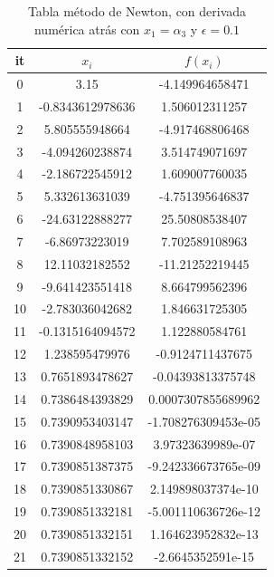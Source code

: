 \documentclass{article} %
\begin{document}
\begin{table}[H]
\centering
\begin{tabular}{|c|c|c|}
\hline
it & $x_i$ & $f(x_i)$\\
\hline
0 & 3.15 & -4.149964658471\\
1 & -0.8343612978636 & 1.506012311257\\
2 & 5.805555948664 & -4.917468806468\\
3 & -4.094260238874 & 3.514749071697\\
4 & -2.186722545912 & 1.609007760035\\
5 & 5.332613631039 & -4.751395646837\\
6 & -24.63122888277 & 25.50808538407\\
7 & -6.86973223019 & 7.702589108963\\
8 & 12.11032182552 & -11.21252219445\\
9 & -9.641423551418 & 8.664799562396\\
10 & -2.783036042682 & 1.846631725305\\
11 & -0.1315164094572 & 1.122880584761\\
12 & 1.238595479976 & -0.9124711437675\\
13 & 0.7651893478627 & -0.04393813375748\\
14 & 0.7386484393829 & 0.0007307855689962\\
15 & 0.7390953403147 & -1.708276309453e-05\\
16 & 0.7390848958103 & 3.97323639989e-07\\
17 & 0.7390851387375 & -9.242336673765e-09\\
18 & 0.7390851330867 & 2.149898037374e-10\\
19 & 0.7390851332181 & -5.001110636726e-12\\
20 & 0.7390851332151 & 1.164623952832e-13\\
21 & 0.7390851332152 & -2.6645352591e-15\\
\hline
\end{tabular}
\caption{Tabla método de Newton, con derivada numérica atrás con $x_1 = \alpha_3$ y $\epsilon = 0.1$}
\end{table}
\end{document}
